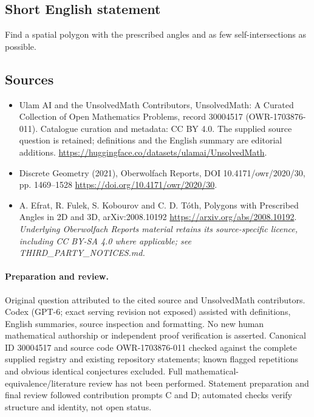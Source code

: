 \documentclass[11pt]{article}
\begin{document}
\subsection{Short English statement}
Find a spatial polygon with the prescribed angles and as few self-intersections as possible.
\subsection{Sources}
\begin{itemize}
\item[\hypertarget{source:30004517:1}{S1}] Ulam AI and the UnsolvedMath Contributors, UnsolvedMath: A Curated Collection of Open Mathematics Problems, record 30004517 (OWR-1703876-011). Catalogue curation and metadata: CC BY 4.0. The supplied source question is retained; definitions and the English summary are editorial additions.
\url{https://huggingface.co/datasets/ulamai/UnsolvedMath}.
\item[\hypertarget{source:30004517:2}{S2}] Discrete Geometry (2021), Oberwolfach Reports, DOI 10.4171/owr/2020/30, pp. 1469--1528
\url{https://doi.org/10.4171/owr/2020/30}.
\item[\hypertarget{source:30004517:3}{S3}] A. Efrat, R. Fulek, S. Kobourov and C. D. Tóth, Polygons with Prescribed Angles in 2D and 3D, arXiv:2008.10192
\url{https://arxiv.org/abs/2008.10192}.
\textit{Underlying Oberwolfach Reports material retains its source-specific licence, including CC BY-SA 4.0 where applicable; see THIRD\_PARTY\_NOTICES.md.}
\end{itemize}
\paragraph{Preparation and review.}
Original question attributed to the cited source and UnsolvedMath contributors. Codex (GPT-6; exact serving revision not exposed) assisted with definitions, English summaries, source inspection and formatting. No new human mathematical authorship or independent proof verification is asserted. Canonical ID 30004517 and source code OWR-1703876-011 checked against the complete supplied registry and existing repository statements; known flagged repetitions and obvious identical conjectures excluded. Full mathematical-equivalence/literature review has not been performed. Statement preparation and final review followed contribution prompts C and D; automated checks verify structure and identity, not open status.
\label{end:30004517}
\end{document}
